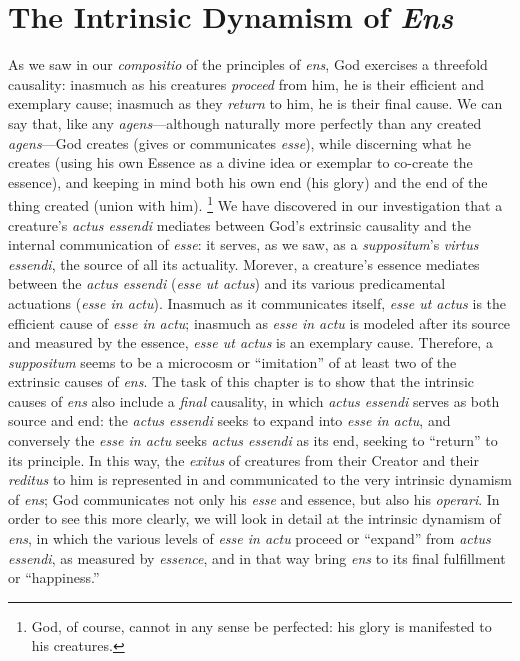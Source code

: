 
\chapter{The Intrinsic Dynamism of \emph{Ens}}
\label{chap:dynamism}

As we saw in our \emph{compositio} of the principles of \emph{ens}, God exercises a threefold causality: inasmuch as his creatures \emph{proceed} from him, he is their efficient and exemplary cause; inasmuch as they \emph{return} to him, he is their final cause. We can say that, like any \emph{agens}---although naturally more perfectly than any created \emph{agens}---God creates (gives or communicates \emph{esse}), while discerning what he creates (using his own Essence as a divine idea or exemplar to co-create the essence), and keeping in mind both his own end (his glory) and the end of the thing created (union with him).%
%
\footnote{God, of course, cannot in any sense be perfected: his glory is manifested to his creatures.}
%
We have discovered in our investigation that a creature's \emph{actus essendi} mediates between God's extrinsic causality and the internal communication of \emph{esse}: it serves, as we saw, as a \emph{suppositum}'s \emph{virtus essendi}, the source of all its actuality. Morever, a creature's essence mediates between the \emph{actus essendi} (\emph{esse ut actus}) and its various predicamental actuations (\emph{esse in actu}).  Inasmuch as it communicates itself, \emph{esse ut actus} is the efficient cause of \emph{esse in actu}; inasmuch as \emph{esse in actu} is modeled after its source and measured by the essence, \emph{esse ut actus} is an exemplary cause.  Therefore, a \emph{suppositum} seems to be a microcosm or ``imitation'' of at least two of the extrinsic causes of \emph{ens}. The task of this chapter is to show that the intrinsic causes of \emph{ens} also include a \emph{final} causality, in which \emph{actus essendi} serves as both source and end: the \emph{actus essendi} seeks to expand into \emph{esse in actu}, and conversely the \emph{esse in actu} seeks \emph{actus essendi} as its end, seeking to ``return'' to its principle. In this way, the \emph{exitus} of creatures from their Creator and their \emph{reditus} to him is represented in and communicated to the very intrinsic dynamism of \emph{ens}; God communicates not only his \emph{esse} and essence, but also his \emph{operari}. In order to see this more clearly, we will look in detail at the intrinsic dynamism of \emph{ens}, in which the various levels of \emph{esse in actu} proceed or ``expand'' from \emph{actus essendi}, as measured by \emph{essence}, and in that way bring \emph{ens} to its final fulfillment or ``happiness.'' 

